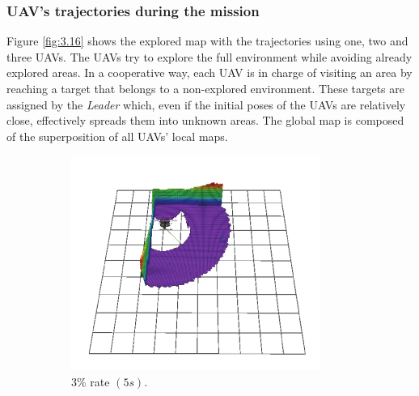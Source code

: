 \documentclass[11pt,openany]{book}
\begin{document}
\subsubsection{UAV's trajectories during the mission}
Figure \ref{fig:3.16} shows the explored map with the trajectories using one, two and three UAVs. The UAVs try to explore the full environment while avoiding already explored areas. In a cooperative way, each UAV is in charge of visiting an area by reaching a target that belongs to a non-explored environment. These targets are assigned by the \textit{Leader} which, even if the initial poses of the UAVs are relatively close, eﬀectively spreads them into unknown areas. The global map is composed of the superposition of all UAVs’ local maps.
\begin{figure}[H]
    \centering
    \begin{subfigure}[H]{0.3\linewidth}
        \centering
        \includegraphics[width=\linewidth]{assets/3_13_a.png}
        \caption{{$3\%$ rate $(5s).$}}
        \label{fig:3.13a}
    \end{subfigure}
    \begin{subfigure}[H]{0.3\linewidth}
        \centering

\end{subfigure}
\end{figure}
\end{document}

